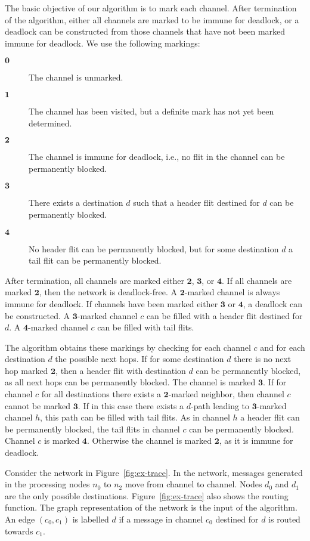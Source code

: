 \documentclass[submission,copyright]{eptcs}
\begin{document}
The basic objective of our algorithm is to mark each channel.
After termination of the algorithm, either all channels are marked to be immune for deadlock, or a deadlock can be constructed from those channels that have not been marked immune for deadlock.
We use the following markings:
\begin{description}
\item[$\mathbf{0}$] The channel is unmarked.
\item[$\mathbf{1}$] The channel has been visited, but a definite mark has not yet been determined. 
\item[$\mathbf{2}$] The channel is immune for deadlock, i.e., no flit in the channel can be permanently blocked.\item[$\mathbf{3}$] There exists a destination $d$ such that a header flit destined for $d$ can be permanently blocked.\item[$\mathbf{4}$] No header flit can be permanently blocked, but for some destination $d$ a tail flit can be permanently blocked.\end{description}
After termination, all channels are marked either $\mathbf{2}$, $\mathbf{3}$, or $\mathbf{4}$. If all channels are marked $\mathbf{2}$, then the network is deadlock-free. A $\mathbf{2}$-marked channel is always immune for deadlock. If channels have been marked either $\mathbf{3}$ or $\mathbf{4}$, a deadlock can be constructed. A $\mathbf{3}$-marked channel $c$ can be filled with a header flit destined for $d$.
A $\mathbf{4}$-marked channel $c$ can be filled with tail flits. 

The algorithm obtains these markings by checking for each channel $c$ and for each destination $d$ the possible next hops.
If for some destination $d$ there is no next hop marked $\mathbf{2}$, then a header flit with destination $d$ can be permanently blocked, as all next hops can be permanently blocked.
The channel is marked $\mathbf{3}$.
If for channel $c$ for all destinations there exists a $\mathbf{2}$-marked neighbor, then channel $c$ cannot be marked $\mathbf{3}$.
If in this case there exists a $d$-path leading to $\mathbf{3}$-marked channel $h$, this path can be filled with tail flits. As in channel $h$ a header flit can be permanently blocked, the tail flits in channel $c$ can be permanently blocked. Channel $c$ is marked $\mathbf{4}$. Otherwise the channel is marked $\mathbf{2}$, as it is immune for deadlock.

Consider the network in Figure~\ref{fig:ex-trace}. In the network, messages generated in the processing nodes $n_0$ to $n_2$ move from channel to channel. Nodes $d_0$ and $d_1$ are the only possible destinations. Figure~\ref{fig:ex-trace} also shows the routing function.
The graph representation of the network is the input of the algorithm.
An edge $(c_0, c_1)$ is labelled $d$ if a message in channel $c_0$ destined for $d$ is routed towards $c_1$.
\end{document}
